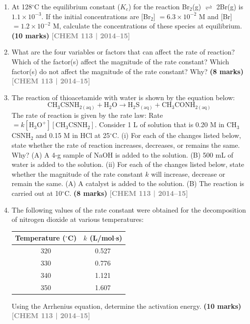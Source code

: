 \documentclass[12pt,a3paper]{article}
\newcommand{\yr}[1]{\hfill\textcolor{gray}{\small\textbf{[#1]}}}
\newcommand{\mk}[1]{\textcolor{orange!70!black}{\small\textbf{(#1 marks)}}}
\begin{document}
\begin{enumerate}
\item At 128$^\circ$C the equilibrium constant ($K_c$) for the reaction Br$_2$(g) $\rightleftharpoons$ 2Br(g) is $1.1 \times 10^{-3}$. If the initial concentrations are [Br$_2$] $= 6.3 \times 10^{-2}$ M and [Br] $= 1.2 \times 10^{-2}$ M, calculate the concentrations of these species at equilibrium. \mk{10}
\yr{CHEM 113 | 2014--15}

\item What are the four variables or factors that can affect the rate of reaction? Which of the factor(s) affect the magnitude of the rate constant? Which factor(s) do not affect the magnitude of the rate constant? Why? \mk{8}
\yr{CHEM 113 | 2014--15}

\item The reaction of thioacetamide with water is shown by the equation below:
\[ \text{CH}_3\text{CSNH}_{2(\text{aq})} + \text{H}_2\text{O} \rightarrow \text{H}_2\text{S}_{(\text{aq})} + \text{CH}_3\text{CONH}_{2(\text{aq})} \]
The rate of reaction is given by the rate law: Rate $= k[\text{H}_3\text{O}^+][\text{CH}_3\text{CSNH}_2]$. Consider 1 L of solution that is 0.20 M in CH$_3$CSNH$_2$ and 0.15 M in HCl at 25$^\circ$C. (i) For each of the changes listed below, state whether the rate of reaction increases, decreases, or remains the same. Why? (A) A 4-g sample of NaOH is added to the solution. (B) 500 mL of water is added to the solution. (ii) For each of the changes listed below, state whether the magnitude of the rate constant $k$ will increase, decrease or remain the same. (A) A catalyst is added to the solution. (B) The reaction is carried out at 10$^\circ$C. \mk{8}
\yr{CHEM 113 | 2014--15}

\item The following values of the rate constant were obtained for the decomposition of nitrogen dioxide at various temperatures:
\begin{center}
\begin{tabular}{cc}
\toprule
Temperature ($^\circ$C) & $k$ (L/mol$\cdot$s) \\
\midrule
320 & 0.527 \\
330 & 0.776 \\
340 & 1.121 \\
350 & 1.607 \\
\bottomrule
\end{tabular}
\end{center}
Using the Arrhenius equation, determine the activation energy. \mk{10}
\yr{CHEM 113 | 2014--15}


\end{enumerate}
\end{document}
